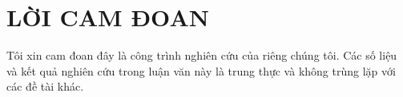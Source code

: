 
\vspace{2cm}

%
%
%
%	
%	

\section*{\centering  \Large LỜI CAM ĐOAN}
{}
\label{chap:Reassurances}
\vspace{2cm}




Tôi xin cam đoan đây là công trình nghiên cứu của riêng chúng tôi. Các số liệu và kết quả nghiên cứu trong luận văn này là trung thực và không trùng lặp với các đề tài khác.

\pagebreak